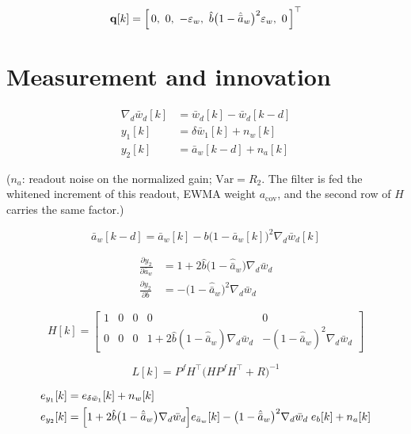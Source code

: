 \documentclass[11pt,a4paper,fontset=none]{ctexart}
\newcommand{\ba}{\bar{a}}
\newcommand{\bw}{\bar{w}}
\begin{document}
\begin{equation*}
\mathbf{q}[k] = \Bigl[\,0,\ 0,\ -\varepsilon_w,\
\hat{b}\bigl(1-\hat{\ba}_w\bigr)^{2}\varepsilon_w,\ 0\,\Bigr]^{\top}
\end{equation*}


\section{Measurement and innovation}

\begin{align*}
\nabla_d\bw_d[k] &= \bw_d[k] - \bw_d[k-d] \\
y_1[k] &= \delta\bw_1[k] + n_w[k] \\
y_2[k] &= \ba_w[k-d] + n_a[k]
\end{align*}

($n_a$: readout noise on the normalized gain; $\mathrm{Var} = R_2$.
The filter is fed the whitened increment of this readout, EWMA weight
$a_{\mathrm{cov}}$, and the second row of $H$ carries the same factor.)

\begin{equation*}
\ba_w[k-d] = \ba_w[k]
  - b\bigl(1-\ba_w[k]\bigr)^{2}\nabla_d\bw_d[k]
\end{equation*}

\begin{align*}
\frac{\partial y_2}{\partial \ba_w}
  &= 1 + 2\hat{b}\bigl(1-\hat{\ba}_w\bigr)\nabla_d\bw_d \\
\frac{\partial y_2}{\partial b}
  &= -\bigl(1-\hat{\ba}_w\bigr)^{2}\nabla_d\bw_d
\end{align*}

\begin{equation*}
H[k] =
\begin{bmatrix}
1 & 0 & 0 & 0 & 0 \\
0 & 0 & 0 & 1 + 2\hat{b}(1-\hat{\ba}_w)\nabla_d\bw_d
  & -(1-\hat{\ba}_w)^{2}\nabla_d\bw_d
\end{bmatrix}
\end{equation*}

\begin{equation*}
L[k] = P^f H^{\top}\bigl(HP^fH^{\top}+R\bigr)^{-1}
\end{equation*}

\begin{align*}
e_{y_1}[k] &= e_{\delta\bw_1}[k] + n_w[k] \\
e_{y_2}[k] &= \Bigl[1 + 2\hat{b}\bigl(1-\hat{\ba}_w\bigr)
    \nabla_d\bw_d\Bigr] e_{\ba_w}[k]
  - \bigl(1-\hat{\ba}_w\bigr)^{2}\nabla_d\bw_d\;e_b[k]
  + n_a[k]
\end{align*}
\end{document}
